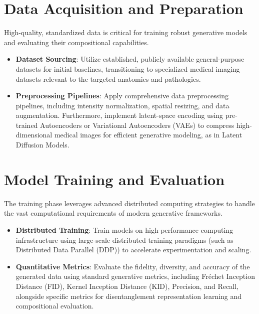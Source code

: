 \section{Data Acquisition and Preparation} 
High-quality, standardized data is critical for training robust generative models and evaluating 
their compositional capabilities.
\begin{itemize}
    \item \textbf{Dataset Sourcing}: Utilize established, publicly available general-purpose datasets for initial baselines, transitioning to specialized medical imaging datasets relevant to the targeted anatomies and pathologies.
    \item \textbf{Preprocessing Pipelines}: Apply comprehensive data preprocessing pipelines, including 
    intensity normalization, spatial resizing, and data augmentation. Furthermore, implement 
    latent-space encoding using pre-trained Autoencoders or Variational Autoencoders (VAEs) to compress 
    high-dimensional medical images for efficient generative modeling, as in Latent Diffusion Models.
\end{itemize} 

\section{Model Training and Evaluation} 
The training phase leverages advanced distributed computing strategies to handle the vast computational 
requirements of modern generative frameworks.
\begin{itemize}
    \item \textbf{Distributed Training}: Train models on high-performance computing infrastructure using 
    large-scale distributed training paradigms (such as Distributed Data Parallel (DDP)) to accelerate experimentation and scaling.
    \item \textbf{Quantitative Metrics}: Evaluate the fidelity, diversity, and accuracy of the generated 
    data using standard generative metrics, including Fréchet Inception Distance (FID), Kernel Inception 
    Distance (KID), Precision, and Recall, alongside specific metrics for disentanglement representation 
    learning and compositional evaluation.
\end{itemize}



